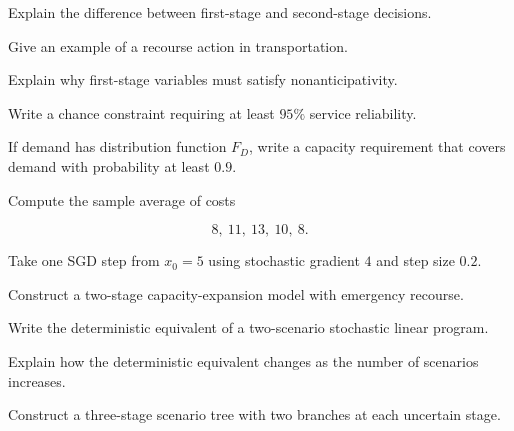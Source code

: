 \begin{exercise}[2]
Explain the difference between first-stage and second-stage decisions.
\end{exercise}

\begin{exercise}[2]
Give an example of a recourse action in transportation.
\end{exercise}

\begin{exercise}[2]
Explain why first-stage variables must satisfy nonanticipativity.
\end{exercise}

\begin{exercise}[2]
Write a chance constraint requiring at least \(95\%\) service reliability.
\end{exercise}

\begin{exercise}[2]
If demand has distribution function \(F_D\), write a capacity requirement
that covers demand with probability at least \(0.9\).
\end{exercise}

\begin{exercise}[2]
Compute the sample average of costs

\[
8,\ 11,\ 13,\ 10,\ 8.
\]
\end{exercise}

\begin{exercise}[2]
Take one SGD step from \(x_0=5\) using stochastic gradient \(4\) and step
size \(0.2\).
\end{exercise}

\begin{exercise}[3]
Construct a two-stage capacity-expansion model with emergency recourse.
\end{exercise}

\begin{exercise}[3]
Write the deterministic equivalent of a two-scenario stochastic linear
program.
\end{exercise}

\begin{exercise}[3]
Explain how the deterministic equivalent changes as the number of
scenarios increases.
\end{exercise}

\begin{exercise}[3]
Construct a three-stage scenario tree with two branches at each uncertain
stage.
\end{exercise}

